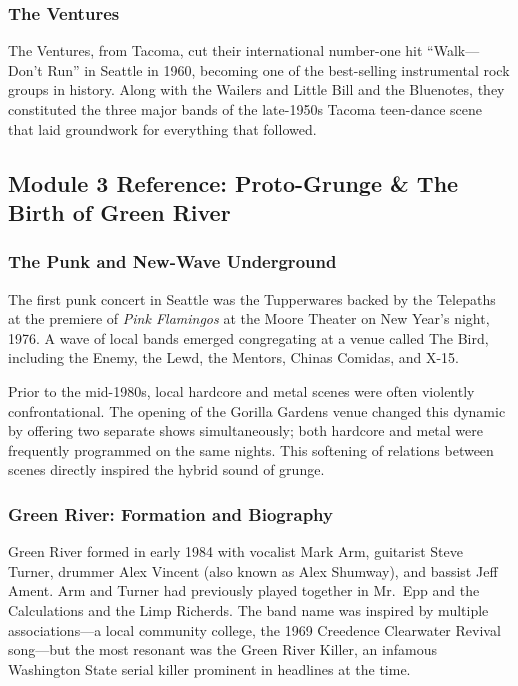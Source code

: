\documentclass[11pt,letterpaper]{article}
\begin{document}
\subsubsection{The Ventures}

The Ventures, from Tacoma, cut their international number-one hit ``Walk---Don't Run'' in Seattle in 1960, becoming one of the best-selling instrumental rock groups in history. Along with the Wailers and Little Bill and the Bluenotes, they constituted the three major bands of the late-1950s Tacoma teen-dance scene that laid groundwork for everything that followed.

\subsection{Module 3 Reference: Proto-Grunge \& The Birth of Green River}

\subsubsection{The Punk and New-Wave Underground}

The first punk concert in Seattle was the Tupperwares backed by the Telepaths at the premiere of \textit{Pink Flamingos} at the Moore Theater on New Year's night, 1976. A wave of local bands emerged congregating at a venue called The Bird, including the Enemy, the Lewd, the Mentors, Chinas Comidas, and X-15.

Prior to the mid-1980s, local hardcore and metal scenes were often violently confrontational. The opening of the Gorilla Gardens venue changed this dynamic by offering two separate shows simultaneously; both hardcore and metal were frequently programmed on the same nights. This softening of relations between scenes directly inspired the hybrid sound of grunge.

\subsubsection{Green River: Formation and Biography}

Green River formed in early 1984 with vocalist Mark Arm, guitarist Steve Turner, drummer Alex Vincent (also known as Alex Shumway), and bassist Jeff Ament. Arm and Turner had previously played together in Mr.\ Epp and the Calculations and the Limp Richerds. The band name was inspired by multiple associations---a local community college, the 1969 Creedence Clearwater Revival song---but the most resonant was the Green River Killer, an infamous Washington State serial killer prominent in headlines at the time.
\end{document}
